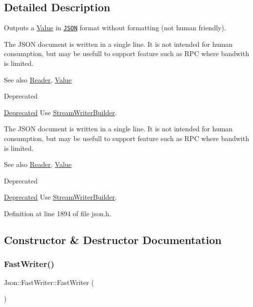 \subsection{Detailed Description}
Outputs a \hyperlink{class_json_1_1_value}{Value} in \href{http://www.json.org}{\tt J\+S\+ON} format without formatting (not human friendly). 

The J\+S\+ON document is written in a single line. It is not intended for \textquotesingle{}human\textquotesingle{} consumption, but may be usefull to support feature such as R\+PC where bandwith is limited. \begin{DoxySeeAlso}{See also}
\hyperlink{class_json_1_1_reader}{Reader}, \hyperlink{class_json_1_1_value}{Value} 
\end{DoxySeeAlso}
\begin{DoxyRefDesc}{Deprecated}
\item[\hyperlink{deprecated__deprecated000008}{Deprecated}]Use \hyperlink{class_json_1_1_stream_writer_builder}{Stream\+Writer\+Builder}. \end{DoxyRefDesc}


The J\+S\+ON document is written in a single line. It is not intended for \textquotesingle{}human\textquotesingle{} consumption, but may be usefull to support feature such as R\+PC where bandwith is limited. \begin{DoxySeeAlso}{See also}
\hyperlink{class_json_1_1_reader}{Reader}, \hyperlink{class_json_1_1_value}{Value} 
\end{DoxySeeAlso}
\begin{DoxyRefDesc}{Deprecated}
\item[\hyperlink{deprecated__deprecated000018}{Deprecated}]Use \hyperlink{class_json_1_1_stream_writer_builder}{Stream\+Writer\+Builder}. \end{DoxyRefDesc}


Definition at line 1894 of file json.\+h.



\subsection{Constructor \& Destructor Documentation}
\hypertarget{class_json_1_1_fast_writer_a1bbc73ce1a1cc7b09cd1e02db3905170}{}\label{class_json_1_1_fast_writer_a1bbc73ce1a1cc7b09cd1e02db3905170} 
\subsubsection{\texorpdfstring{Fast\+Writer()}{FastWriter()}\hspace{0.1cm}{\footnotesize\ttfamily [1/2]}}
{\footnotesize\ttfamily Json\+::\+Fast\+Writer\+::\+Fast\+Writer (\begin{DoxyParamCaption}{ }\end{DoxyParamCaption})}



